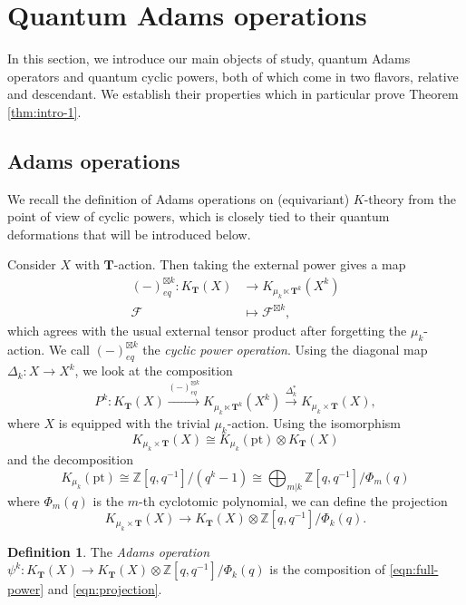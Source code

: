 \documentclass[reqno]{amsart}
\numberwithin{equation}{section}
\numberwithin{equation}{section}
\numberwithin{equation}{section}
\theoremstyle{definition}
\newtheorem{defn}[thm]{Definition}
\theoremstyle{remark}
\theoremstyle{remark}
\begin{document}
\section{Quantum Adams operations}\label{sec:oper}
In this section, we introduce our main objects of study, quantum Adams operators and quantum cyclic powers, both of which come in two flavors, relative and descendant. We establish their properties which in particular prove Theorem \ref{thm:intro-1}.

\subsection{Adams operations}\label{sec:ordinary-adams}
We recall the definition of Adams operations on (equivariant) $K$-theory from the point of view of cyclic powers, which is closely tied to their quantum deformations that will be introduced below.

Consider $X$ with $\mathbf{T}$-action. Then taking the external power gives a map
\begin{equation}
    \begin{aligned}
        (-)^{\boxtimes k}_{eq}: K_{\mathbf{T}}(X) &\to K_{\mu_k \ltimes \mathbf{T}^k}(X^k) \\
        \mathcal{F} &\mapsto \mathcal{F}^{\boxtimes k},
    \end{aligned}
\end{equation}
which agrees with the usual external tensor product after forgetting the $\mu_k$-action. We call $(-)^{\boxtimes k}_{eq}$ the \emph{cyclic power operation}. Using the diagonal map $\Delta_k: X \to X^{k}$, we look at the composition
\begin{equation}\label{eqn:full-power}
    P^k: K_{\mathbf{T}}(X) \xrightarrow{(-)^{\boxtimes k}_{eq}} K_{\mu_k \ltimes \mathbf{T}^k}(X^k) \xrightarrow{\Delta_k^*} K_{\mu_k \times \mathbf{T}}(X),
\end{equation}
where $X$ is equipped with the trivial $\mu_k$-action. Using the isomorphism
\begin{equation}
    K_{\mu_k \times \mathbf{T}}(X) \cong K_{\mu_k}(\mathrm{pt}) \otimes K_{\mathbf{T}}(X)
\end{equation}
and the decomposition
\begin{equation}
    K_{\mu_k}(\mathrm{pt}) \cong \mathbb{Z}[q, q^{-1}] / (q^k - 1) \cong \bigoplus_{m | k} \mathbb{Z}[q, q^{-1}] / \Phi_m(q)
\end{equation}
where $\Phi_m(q)$ is the $m$-th cyclotomic polynomial, we can define the projection
\begin{equation}\label{eqn:projection}
    K_{\mu_k \times \mathbf{T}}(X) \to K_{\mathbf{T}}(X) \otimes \mathbb{Z}[q, q^{-1}] / \Phi_k(q).
\end{equation}
\begin{defn}
    The \emph{Adams operation} $\psi^k: K_{\mathbf{T}}(X) \to K_{\mathbf{T}}(X) \otimes \mathbb{Z}[q, q^{-1}] / \Phi_k(q)$ is the composition of \eqref{eqn:full-power} and \eqref{eqn:projection}.
\end{defn}
\end{document}
